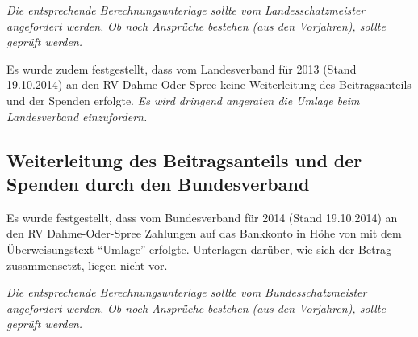 \documentclass[%
	titlepage,oneside,12pt,headlines=1.5,numbers=noenddot, chapterprefix=false,parskip=full-,DIV=14,pagesize]{scrreprt}
\begin{document}
\textit{Die entsprechende Berechnungsunterlage sollte vom Landesschatzmeister angefordert werden.} \textit{Ob noch Ansprüche bestehen (aus den Vorjahren), sollte geprüft werden.}

Es wurde zudem festgestellt, dass vom Landesverband für 2013 (Stand 19.10.2014) an den RV Dahme-Oder-Spree keine Weiterleitung des Beitragsanteils und der Spenden erfolgte. \textit{Es wird dringend angeraten die Umlage beim Landesverband einzufordern.}

\subsection{Weiterleitung des Beitragsanteils und der Spenden durch den Bundesverband}
Es wurde festgestellt, dass vom Bundesverband für 2014 (Stand 19.10.2014) an den RV Dahme-Oder-Spree Zahlungen auf das Bankkonto in Höhe von  mit dem Überweisungstext \enquote{Umlage} erfolgte. Unterlagen darüber, wie sich der Betrag zusammensetzt, liegen nicht vor.

\textit{Die entsprechende Berechnungsunterlage sollte vom Bundesschatzmeister angefordert werden.} \textit{Ob noch Ansprüche bestehen (aus den Vorjahren), sollte geprüft werden.}

\pagebreak
\end{document}
